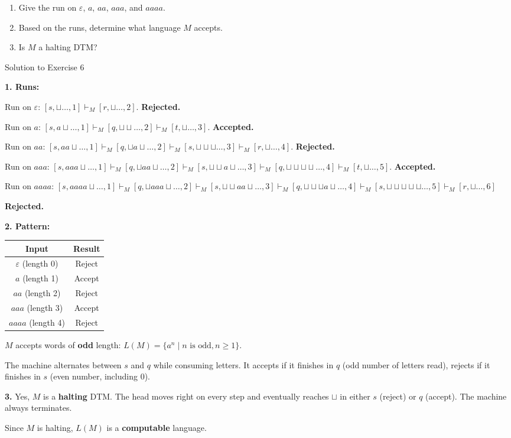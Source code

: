\documentclass[11pt,a4paper]{article}
\newcommand{\blank}{\sqcup}
\newcommand{\fitmath}[1]{\begin{adjustbox}{max width=\linewidth}$\displaystyle #1$\end{adjustbox}}
\begin{document}
\begin{enumerate}
    \item Give the run on $\varepsilon$, $a$, $aa$, $aaa$, and $aaaa$.
    \item Based on the runs, determine what language $M$ accepts.
    \item Is $M$ a halting DTM?
\end{enumerate}

\begin{solutionbox}{Solution to Exercise 6}

\textbf{1. Runs:}

Run on $\varepsilon$: $[s, \blank\ldots, 1] \vdash_M [r, \blank\ldots, 2]$. \textbf{Rejected.}

Run on $a$: $[s, a\blank\ldots, 1] \vdash_M [q, \blank\blank\ldots, 2] \vdash_M [t, \blank\ldots, 3]$. \textbf{Accepted.}

Run on $aa$: $[s, aa\blank\ldots, 1] \vdash_M [q, \blank a\blank\ldots, 2] \vdash_M [s, \blank\blank\blank\ldots, 3] \vdash_M [r, \blank\ldots, 4]$. \textbf{Rejected.}

Run on $aaa$: $[s, aaa\blank\ldots, 1] \vdash_M [q, \blank aa\blank\ldots, 2] \vdash_M [s, \blank\blank a\blank\ldots, 3] \vdash_M [q, \blank\blank\blank\blank\ldots, 4] \vdash_M [t, \blank\ldots, 5]$. \textbf{Accepted.}

Run on $aaaa$:
\fitmath{[s, aaaa\blank\ldots, 1] \vdash_M [q, \blank aaa\blank\ldots, 2] \vdash_M [s, \blank\blank aa\blank\ldots, 3] \vdash_M [q, \blank\blank\blank a\blank\ldots, 4] \vdash_M [s, \blank\blank\blank\blank\blank\ldots, 5] \vdash_M [r, \blank\ldots, 6]}

\textbf{Rejected.}

\medskip
\textbf{2. Pattern:}
\begin{center}
\begin{tabular}{c|c}
Input & Result \\
\hline
$\varepsilon$ (length 0) & Reject \\
$a$ (length 1) & Accept \\
$aa$ (length 2) & Reject \\
$aaa$ (length 3) & Accept \\
$aaaa$ (length 4) & Reject \\
\end{tabular}
\end{center}

$M$ accepts words of \textbf{odd} length: $L(M) = \{a^n \mid n \text{ is odd}, n \geq 1\}$.

The machine alternates between $s$ and $q$ while consuming letters. It accepts if it finishes in $q$ (odd number of letters read), rejects if it finishes in $s$ (even number, including 0).

\medskip
\textbf{3.} Yes, $M$ is a \textbf{halting} DTM. The head moves right on every step and eventually reaches $\blank$ in either $s$ (reject) or $q$ (accept). The machine always terminates.

Since $M$ is halting, $L(M)$ is a \textbf{computable} language.
\end{solutionbox}
\end{document}
